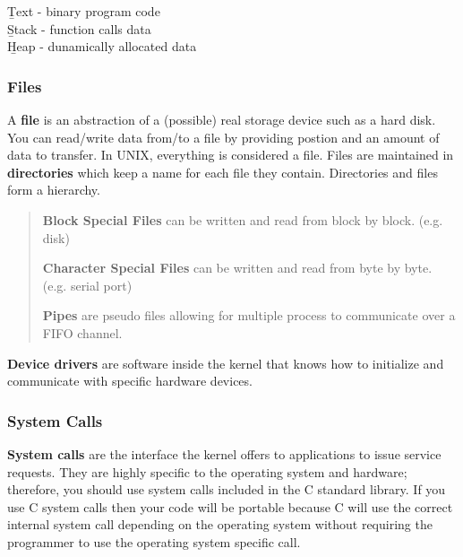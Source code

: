 \documentclass{article}
\begin{document}
    \begin{center}
        \b{Text} - binary program code \\

        \b{Stack} - function calls data \\

        \b{Heap} - dunamically allocated data \\
    \end{center}

    \subsubsection{Files}

    \noindent A \textbf{file} is an abstraction of a (possible) real storage device such as a hard disk. You can read/write data from/to a file by providing postion and an amount of data to transfer. In UNIX, everything is considered a file. Files are maintained in \textbf{directories} which keep a name for each file they contain. Directories and files form a hierarchy. 

    \begin{quote}
    
    \textbf{Block Special Files} can be written and read from block by block. (e.g. disk)

    \textbf{Character Special Files} can be written and read from byte by byte. (e.g. serial port)

    \textbf{Pipes} are pseudo files allowing for multiple process to communicate over a FIFO channel. 

    \end{quote}

    \noindent \textbf{Device drivers} are software inside the kernel that knows how to initialize and communicate with specific hardware devices. 

    \subsubsection{System Calls}

    \textbf{System calls} are the interface the kernel offers to applications to issue service requests. They are highly specific to the operating system and hardware; therefore, you should use system calls included in the C standard library. If you use C system calls then your code will be portable because C will use the correct internal system call depending on the operating system without requiring the programmer to use the operating system specific call. 
\end{document}
